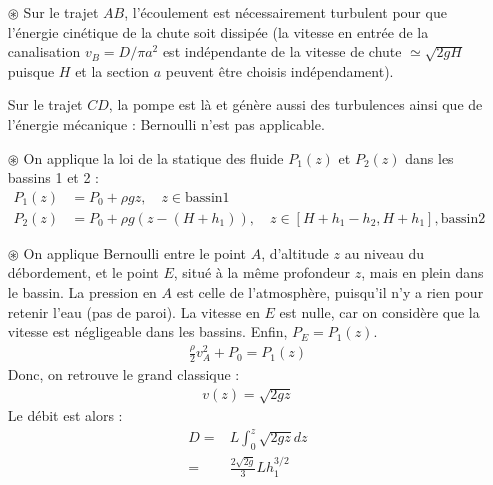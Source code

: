 \documentclass{report}
\begin{document}
\begin{itemize}

	\item[$\circledast$] Sur le trajet $AB$, l'écoulement est nécessairement turbulent pour que l'énergie cinétique de la chute soit dissipée (la vitesse en entrée de la canalisation $v_B=D/\pi a^2$ est indépendante de la vitesse de chute $\simeq\sqrt{2gH}$ puisque $H$ et la section $a$ peuvent être choisis indépendament). 
	
	Sur le trajet $CD$, la pompe est là et génère aussi des turbulences ainsi que de l'énergie mécanique : Bernoulli n'est pas applicable.

	\item[$\circledast$] On applique la loi de la statique des fluide $P_1(z)$ et $P_2(z)$ dans les bassins 1 et 2 :
	\begin{align*}
		P_1(z) &= P_0+\rho g z, \quad z\in \mathrm{bassin 1} \\
		P_2(z) &= P_0+\rho g (z - (H + h_1)), \quad z\in [H + h_1 - h_2, H + h_1], \mathrm{bassin 2}
	\end{align*}
	
	\item[$\circledast$] On applique Bernoulli entre le point $A$, d'altitude $z$ au niveau du débordement, et le point $E$, situé à la même profondeur $z$, mais en plein dans le bassin. La pression en $A$ est celle de l'atmosphère, puisqu'il n'y a rien pour retenir l'eau (pas de paroi). La vitesse en $E$ est nulle, car on considère que la vitesse est négligeable dans les bassins. Enfin, $P_{E}=P_1(z)$.
	\begin{align*}
		\frac{\rho}{2}v_A^2+P_0=P_{1}(z)
	\end{align*}
	Donc, on retrouve le grand classique :
	\begin{align*}
		v(z) = \sqrt{2gz}
	\end{align*}	
	Le débit est alors :
	\begin{align*}
		D =& L\int_0^z\sqrt{2gz}dz \\
		=&\frac{2\sqrt{2g}}{3}Lh_1^{3/2}
	\end{align*}		
	

\end{itemize}
\end{document}
